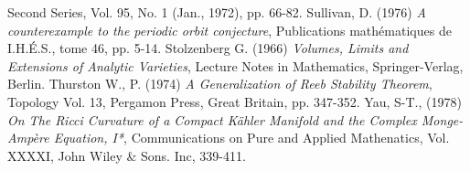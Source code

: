 \documentclass[letterpaper]{beamer}
\begin{document}
\begin{thebibliography}{3}
Second Series, Vol. 95, No. 1 (Jan., 1972), pp. 66-82.
 Sullivan, D. (1976) \textit{A counterexample to the  periodic orbit conjecture}, Publications mathématiques de I.H.É.S., tome 46, pp. 5-14.
 Stolzenberg G. (1966) \textit{Volumes, Limits and
Extensions of Analytic Varieties}, Lecture Notes in Mathematics,
Springer-Verlag, Berlin.
 Thurston W., P. (1974) \textit{A Generalization of Reeb Stability Theorem}, Topology Vol. 13,
Pergamon Press, Great Britain, pp. 347-352.
 Yau, S-T., (1978) \textit{On The Ricci Curvature of a Compact K\"ahler Manifold and the Complex Monge-Amp\`ere Equation, I*},
Communications on Pure and Applied Mathenatics, Vol. XXXXI, John Wiley \& Sons. Inc, 339-411.
\end{thebibliography}
\end{document}
